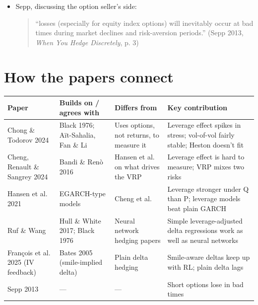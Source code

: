\documentclass{article}
\begin{document}
\begin{itemize}

\item Sepp, discussing the option seller's side:

\begin{quote}``losses (especially for equity index options) will inevitably occur at bad times during market declines and risk-aversion periods.'' (Sepp 2013, \emph{When You Hedge Discretely}, p. 3)\end{quote}

\end{itemize}

\section{How the papers connect}

\begin{center}\small
\begin{tabularx}{\linewidth}{>{\raggedright\arraybackslash}X >{\raggedright\arraybackslash}X >{\raggedright\arraybackslash}X >{\raggedright\arraybackslash}X}
\toprule
\textbf{Paper} & \textbf{Builds on /\allowbreak{} agrees with} & \textbf{Differs from} & \textbf{Key contribution} \\
\midrule
Chong \& Todorov 2024 & Black 1976; Aït-Sahalia, Fan \& Li & Uses options, not returns, to measure it & Leverage effect spikes in stress; vol-of-vol fairly stable; Heston doesn't fit \\
Cheng, Renault \& Sangrey 2024 & Bandi \& Renò 2016 & Hansen et al. on what drives the VRP & Leverage effect is hard to measure; VRP mixes two risks \\
Hansen et al. 2021 & EGARCH-type models & Cheng et al. & Leverage stronger under Q than P; leverage models beat plain GARCH \\
Ruf \& Wang & Hull \& White 2017; Black 1976 & Neural network hedging papers & Simple leverage-adjusted delta regressions work as well as neural networks \\
François et al. 2025 (IV feedback) & Bates 2005 (smile-implied delta) & Plain delta hedging & Smile-aware deltas keep up with RL; plain delta lags \\
Sepp 2013 & --- & --- & Short options lose in bad times \\
\bottomrule
\end{tabularx}
\end{center}
\end{document}
